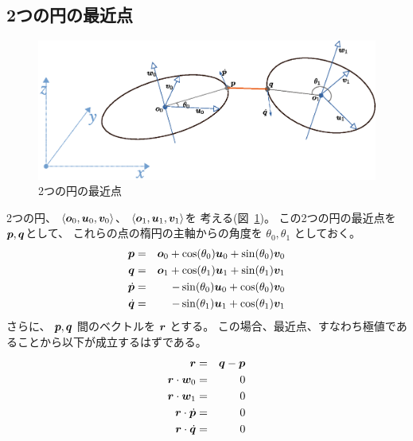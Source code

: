 \documentclass[11pt,a4j]{jarticle}
\def\figref#1{図~\ref{#1}}
\begin{document}
\subsection{2つの円の最近点}

\begin{figure}[h]
  \centering
  \includegraphics[width=.8\linewidth]{Fig/figure-05.eps}
  \caption{2つの円の最近点}
  \label{fig:Fig/figure-05.eps}
\end{figure}

2つの円、
$\left< {\bm{o}}_0, {\bm{u}}_0, {\bm{v}}_0 \right>$、
$\left< {\bm{o}}_1, {\bm{u}}_1, {\bm{v}}_1 \right>$を
考える(\figref{fig:Fig/figure-05.eps})。
この2つの円の最近点を ${\bm{p}}, {\bm{q}}$として、
これらの点の楕円の主軸からの角度を $\theta_0, \theta_1$ としておく。
  \begin{eqnarray}
    {\bm{p}} & = & {\bm{o}}_0 + \cos(\theta_0) {\bm{u}}_0 + \sin(\theta_0) {\bm{v}}_0
  \\
    {\bm{q}} & = & {\bm{o}}_1 + \cos(\theta_1) {\bm{u}}_1 + \sin(\theta_1) {\bm{v}}_1
  \\
    \dot{{\bm{p}}} & = & - \sin(\theta_0) {\bm{u}}_0 + \cos(\theta_0) {\bm{v}}_0
  \\
    \dot{{\bm{q}}} & = & - \sin(\theta_1) {\bm{u}}_1 + \cos(\theta_1) {\bm{v}}_1
  \end{eqnarray}
さらに、 ${\bm{p}}, {\bm{q}}$ 間のベクトルを ${\bm{r}}$ とする。  
この場合、最近点、すなわち極値であることから以下が成立するはずである。
  \begin{eqnarray}
    {\bm{r}} & = & {\bm{q}} - {\bm{p}}
  \\
    {\bm{r}} \cdot {\bm{w}}_0 & = & 0
  \\
    {\bm{r}} \cdot {\bm{w}}_1 & = & 0
  \\
    {\bm{r}} \cdot \dot{{\bm{p}}} & = & 0
  \\
    {\bm{r}} \cdot \dot{{\bm{q}}} & = & 0
  \end{eqnarray}
\end{document}
